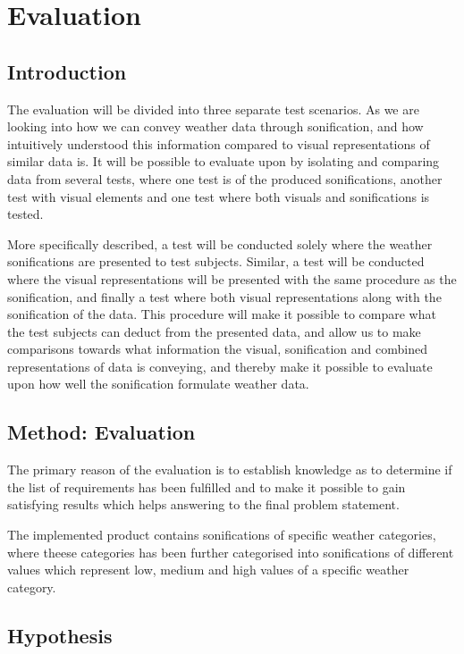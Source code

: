 \section{Evaluation} \label{sec:evaluation}


\subsection{Introduction}
The evaluation will be divided into three separate test scenarios. As we are looking into how we can convey weather data through sonification, and how intuitively understood this information compared to visual representations of similar data is. It will be possible to evaluate upon by isolating and comparing data from several tests, where one test is of the produced sonifications, another test with visual elements and one test where both visuals and sonifications is tested. 


More specifically described, a test will be conducted solely where the weather sonifications are presented to test subjects. Similar, a test will be conducted where the visual representations will be presented with the same procedure as the sonification, and finally a test where both visual representations along with the sonification of the data. 
This procedure will make it possible to compare what the test subjects can deduct from the presented data, and allow us to make comparisons towards what information the visual, sonification and combined representations of data is conveying, and thereby make it possible to evaluate upon how well the sonification formulate weather data.

\subsection{Method: Evaluation}
The primary reason of the evaluation is to establish knowledge as to determine if the list of requirements has been fulfilled and to make it possible to gain satisfying results which helps answering to the final problem statement.

The implemented product contains sonifications of specific weather categories, where theese categories has been further categorised into sonifications of different values which represent low, medium and high values of a specific weather category.



\subsection{Hypothesis}


